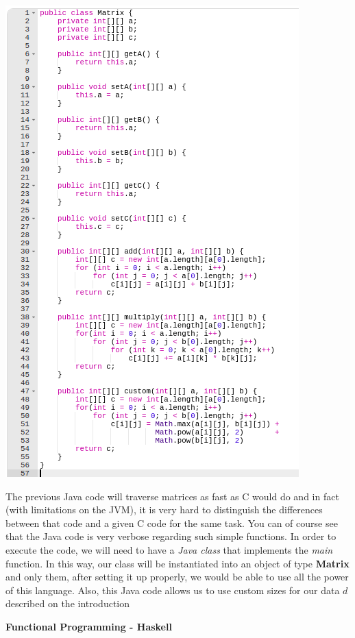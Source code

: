 \documentclass[conference]{IEEEtran}
\begin{document}
\includegraphics[scale=0.57]{java_code}

The previous Java code will traverse matrices as fast as C would do and in fact (with limitations on the JVM), it is very hard to distinguish the differences between that code and a given C code for the same task. You can of course see that the Java code is very verbose regarding such simple functions. In order to execute the code, we will need to have a \textit{Java class} that implements the \textit{main} function. In this way, our class will be instantiated into an object of type \textbf{Matrix} and only them, after setting it up properly, we would be able to use all the power of this language. Also, this Java code allows us to use custom sizes for our data $d$ described on the introduction 

\textbf{ Functional Programming - Haskell }
\end{document}
